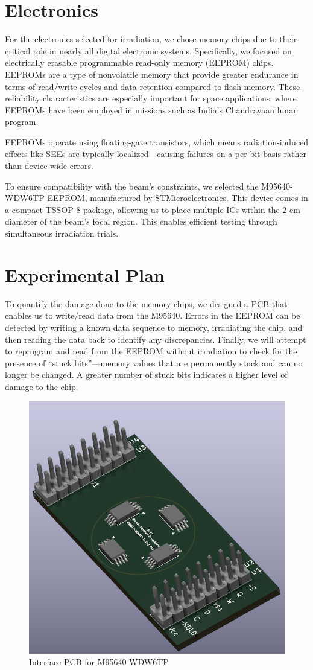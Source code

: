 \documentclass{article}
\begin{document}
\part{Electronics}
For the electronics selected for irradiation, we chose memory chips due to their critical role in nearly 
all digital electronic systems. Specifically, we focused on electrically erasable programmable read-only memory (EEPROM) chips.
EEPROMs are a type of nonvolatile memory that provide greater endurance in terms of read/write cycles and data retention compared to flash memory. 
These reliability characteristics are especially important for space applications, where EEPROMs have been employed in missions such as India's Chandrayaan lunar program. 

EEPROMs operate using floating-gate transistors, which means radiation-induced effects like SEEs are typically localized—causing failures on a per-bit basis rather than device-wide errors.

To ensure compatibility with the beam's constraints, we selected the M95640-WDW6TP EEPROM, manufactured by STMicroelectronics. This device comes in a compact TSSOP-8 package, allowing us to place multiple ICs within the 2 cm diameter of the beam's focal region.
This enables efficient testing through simultaneous irradiation trials.

\vspace{-3em}

\part{Experimental Plan}
To quantify the damage done to the memory chips, we designed a PCB that enables us to write/read data from the M95640. 
Errors in the EEPROM can be detected by writing a known data sequence to memory, irradiating the chip, and then 
reading the data back to identify any discrepancies. Finally, we will attempt to reprogram and read from the EEPROM without
irradiation to check for the presence of “stuck bits”---memory values that are permanently stuck and can no longer be 
changed. A greater number of stuck bits indicates a higher level of damage to the chip.

\begin{figure}[H]
    \centering
    \includegraphics[width=0.6\linewidth]{./PCB.png}
    \caption{Interface PCB for M95640-WDW6TP}
    \label{fig:enter-label}
\end{figure}
\end{document}
